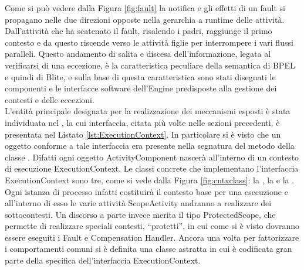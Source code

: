 Come si può vedere dalla Figura \ref{fig:fault} la notifica e gli effetti di un
fault si propagano nelle due direzioni opposte nella gerarchia a runtime delle
attività. Dall'attività che ha scatenato il fault, risalendo i padri, raggiunge
il primo contesto e da questo riscende verso le attività figlie per
interrompere i vari flussi paralleli. Questo andamento di salita e discesa dell'informazione,
legata al verificarsi di una eccezione, \`e la caratteristica peculiare della
semantica di BPEL e quindi di Blite, e sulla base di questa caratteristica sono
stati disegnati le componenti e le interfacce software dell'Engine predisposte
alla gestione dei contesti e delle eccezioni.
\\

L'entità principale designata per la realizzazione dei meccanismi esposti \`e
stata individuata nel , la cui interfaccia, citata più
volte nelle sezioni precedenti, è presentata nel Listato
\ref{lst:ExecutionContext}. In particolare si \`e visto che un oggetto conforme a
tale interfaccia era presente nella segnatura del metodo
 della classe .
Difatti ogni oggetto ActivityComponent nascerà all'interno di un contesto di
esecuzione ExecutionContext. Le classi concrete che implementano l'interfaccia
ExecutionContext sono tre, come si vede dalla Figura \ref{fig:cntxclass}: la
, la  e la .
Ogni istanza di processo infatti costituirà il contesto base per una esecuzione e
all'interno di esso le varie attività ScopeActivity andranno a realizzare dei
sottocontesti. Un discorso a parte invece merita il tipo ProtectedScope, che
permette di realizzare speciali contesti, ``protetti'', in cui come si è visto
dovranno essere eseguiti i Fault e Compensation Handler. Ancora una volta per
fattorizzare i comportamenti comuni si \`e definita una classe astratta
 in cui è codificata gran parte della specifica
dell'interfaccia ExecutionContext.

